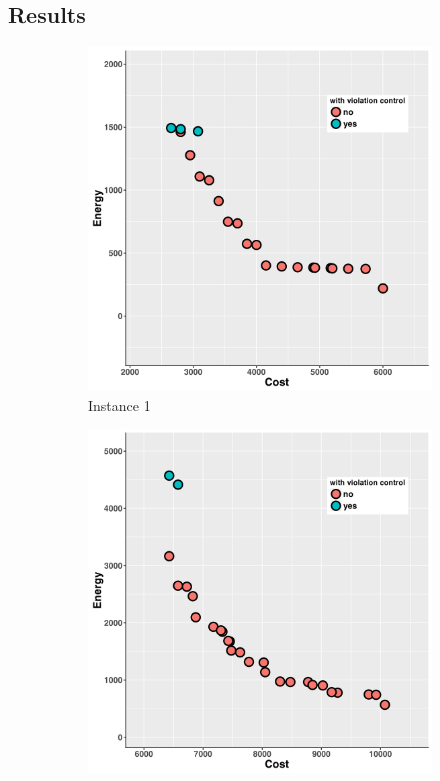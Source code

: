 \subsection{Results}
\begin{figure}
   \centering
   \begin{subfigure}[b]{0.45\textwidth}\includegraphics[width=\textwidth]{pics/preliminary/1/evolve.png}
   \caption{Instance 1}
   \label{fig:a}
   \end{subfigure}
   \begin{subfigure}[b]{0.45\textwidth}\includegraphics[width=\textwidth]{pics/preliminary/2/evolve.png}

\end{subfigure}
\end{figure}
